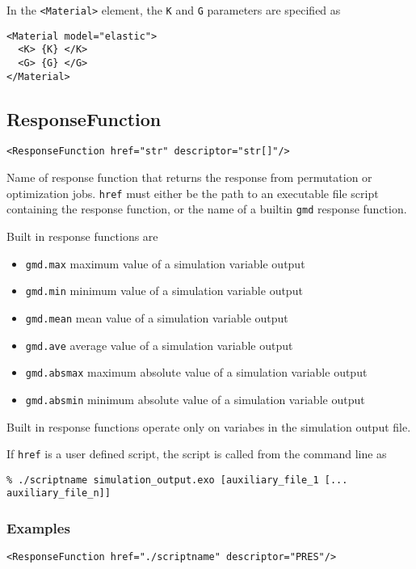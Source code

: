 \documentclass[11pt]{report}
\newcommand{\gmd}{\texttt{gmd}}
\renewcommand{\tag}[1]{\texttt{<#1>}}
\begin{document}
In the \tag{Material} element, the \texttt{K} and \texttt{G} parameters are
specified as
%
\begin{verbatim}
<Material model="elastic">
  <K> {K} </K>
  <G> {G} </G>
</Material>
\end{verbatim}

\subsection{ResponseFunction}
\begin{verbatim}
<ResponseFunction href="str" descriptor="str[]"/>
\end{verbatim}
Name of response function that returns the response from permutation or
optimization jobs. \texttt{href} must either be the path to an executable file
script containing the response function, or the name of a builtin \gmd{}
response function.

Built in response functions are
%
\begin{itemize}
  \item \texttt{gmd.max} maximum value of a simulation variable output
  \item \texttt{gmd.min} minimum value of a simulation variable output
  \item \texttt{gmd.mean} mean value of a simulation variable output
  \item \texttt{gmd.ave} average value of a simulation variable output
  \item \texttt{gmd.absmax} maximum absolute value of a simulation variable output
  \item \texttt{gmd.absmin} minimum absolute value of a simulation variable output
\end{itemize}
%
Built in response functions operate only on variabes in the simulation output file.

If \texttt{href} is a user defined script, the script is called from the
command line as
\begin{verbatim}
% ./scriptname simulation_output.exo [auxiliary_file_1 [... auxiliary_file_n]]
\end{verbatim}

\subsubsection{Examples}
\begin{verbatim}
<ResponseFunction href="./scriptname" descriptor="PRES"/>
\end{verbatim}
\end{document}
